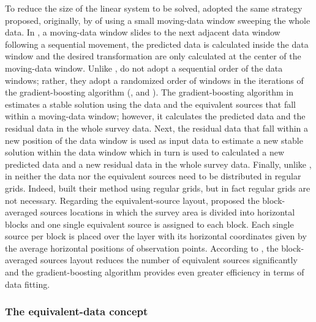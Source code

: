 To reduce the size of the linear system to be solved, \cite{soler-uieda2021}  adopted the same strategy proposed, originally, by \cite{leao-silva1989}  of using a small moving-data window sweeping the whole data.
In \cite{leao-silva1989}, a moving-data window slides to the next adjacent data window following a sequential movement, the predicted data is calculated inside the data window and the desired transformation are only calculated at the center of the moving-data window.
Unlike \cite{leao-silva1989}, \cite{soler-uieda2021} do not adopt a sequential order of the data windows; rather, they adopt a randomized order of windows in the iterations of the gradient-boosting algorithm 
(\citeauthor{friedman2001}, \citeyear{friedman2001} and \citeyear{friedman2002}).
The  gradient-boosting algorithm in \cite{soler-uieda2021} estimates a stable solution using the data and the equivalent sources 
that fall within a moving-data window; however, it calculates the predicted data and the residual data in the whole survey data. 
Next, the residual data  that fall within a new position of the data window is used as input data to estimate a new stable solution within the data window
which in turn is used to calculated a new predicted data and 
a new residual data in the whole survey data.
Finally, unlike \cite{leao-silva1989}, in \cite{soler-uieda2021} neither the data nor the equivalent sources need to be distributed in regular grids.
Indeed, \cite{leao-silva1989} built their method using regular grids, but in fact regular grids are not necessary.
Regarding the equivalent-source layout, \cite{soler-uieda2021} proposed the block-averaged sources locations in which the survey area is divided into horizontal blocks and one single equivalent source is assigned to each block.
Each single source per block is placed over the layer with its horizontal coordinates given by the average horizontal positions of observation points.
According to \cite{soler-uieda2021}, the block-averaged sources layout reduces the number of equivalent sources significantly
and the gradient-boosting algorithm provides even greater efficiency in terms of data fitting.







\subsubsection{The equivalent-data concept}

